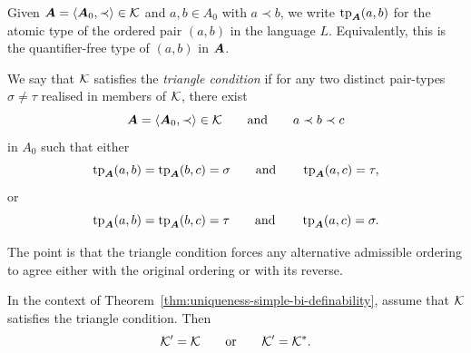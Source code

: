 Given \(\boldsymbol{A}=\langle \boldsymbol{A}_0,\prec\rangle\in\mathcal{K}\) and \(a,b\in A_0\) with
\(a\prec b\), we write \(\operatorname{tp}_{\boldsymbol{A}}(a,b)\)
for the atomic type of the ordered pair \((a,b)\) in the language \(L\). Equivalently, this is the quantifier-free type of \((a,b)\) in \(\boldsymbol{A}\).

\begin{definition}
    \label{def:triangle-condition}
    We say that \(\mathcal{K}\) satisfies the \emph{triangle condition} if for any two
    distinct pair-types \(\sigma\neq \tau\)
    realised in members of \(\mathcal{K}\), there exist
    \[
        \boldsymbol{A}=\langle \boldsymbol{A}_0,\prec\rangle\in \mathcal{K}
        \qquad\text{and}\qquad
        a\prec b\prec c
    \]
    in \(A_0\) such that either
    \[
        \operatorname{tp}_{\boldsymbol{A}}(a,b)=\operatorname{tp}_{\boldsymbol{A}}(b,c)=\sigma
        \qquad\text{and}\qquad
        \operatorname{tp}_{\boldsymbol{A}}(a,c)=\tau,
    \]
    or
    \[
        \operatorname{tp}_{\boldsymbol{A}}(a,b)=\operatorname{tp}_{\boldsymbol{A}}(b,c)=\tau
        \qquad\text{and}\qquad
        \operatorname{tp}_{\boldsymbol{A}}(a,c)=\sigma.
    \]
\end{definition}

The point is that the triangle condition forces any alternative admissible ordering to agree either with the original ordering or with its reverse.

\begin{corollary}
    \label{cor:triangle-condition}
    In the context of Theorem~\ref{thm:uniqueness-simple-bi-definability}, assume that \(\mathcal{K}\) satisfies the triangle condition. Then
    \[
        \mathcal{K}'=\mathcal{K}
        \qquad\text{or}\qquad
        \mathcal{K}'=\mathcal{K}^*.
    \]
\end{corollary}


